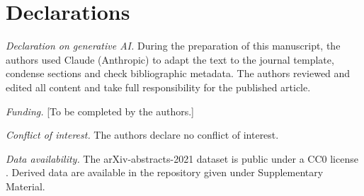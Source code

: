 \documentclass[conference, letterpaper]{IEEEtran}
\newif\ifblind
\begin{document}
\ifblind\else
\fi

\section*{Declarations}

\textit{Declaration on generative AI.} During the preparation of this manuscript, the authors used Claude (Anthropic) to adapt the text to the journal template, condense sections and check bibliographic metadata. The authors reviewed and edited all content and take full responsibility for the published article.

\ifblind
\textit{Funding.} Funding information has been withheld for double-blind review.
\else
\textit{Funding.} [To be completed by the authors.]
\fi

\textit{Conflict of interest.} The authors declare no conflict of interest.

\textit{Data availability.} The arXiv-abstracts-2021 dataset is public under a CC0 license \cite{clement2019}. \ifblind Derived data are described under Supplementary Material.\else Derived data are available in the repository given under Supplementary Material.\fi
\end{document}
